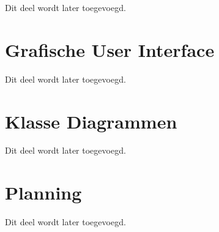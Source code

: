 \documentclass[12pt,a4paper]{report}
\begin{document}
Dit deel wordt later toegevoegd.

\chapter{Grafische User Interface}

Dit deel wordt later toegevoegd.

\chapter{Klasse Diagrammen}

Dit deel wordt later toegevoegd.

\chapter{Planning}
\label{appendix:planning}

Dit deel wordt later toegevoegd.




\end{document}
